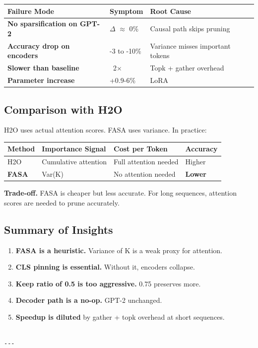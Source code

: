\begin{table}[H]
\centering
\small
\begin{tabular}{lll}
\toprule
\textbf{Failure Mode} & \textbf{Symptom} & \textbf{Root Cause} \\
\midrule
\textbf{No sparsification on GPT-2} & $\Delta$ $\approx$ 0\% & Causal path skips pruning \\
\textbf{Accuracy drop on encoders} & -3 to -10\% & Variance misses important tokens \\
\textbf{Slower than baseline} & ~2$\times$ & Topk + gather overhead \\
\textbf{Parameter increase} & +0.9-6\% & LoRA \\
\bottomrule
\end{tabular}
\end{table}

\subsection{Comparison with H2O}

H2O uses actual attention scores. FASA uses variance. In practice:

\begin{table}[H]
\centering
\small
\begin{tabular}{llll}
\toprule
\textbf{Method} & \textbf{Importance Signal} & \textbf{Cost per Token} & \textbf{Accuracy} \\
\midrule
H2O & Cumulative attention & Full attention needed & Higher \\
\textbf{FASA} & Var(K) & No attention needed & \textbf{Lower} \\
\bottomrule
\end{tabular}
\end{table}

\textbf{Trade-off.} FASA is cheaper but less accurate. For long sequences, 
attention scores are needed to prune accurately.

\subsection{Summary of Insights}

\begin{enumerate}
\item \textbf{FASA is a heuristic.} Variance of K is a weak proxy for attention.
\item \textbf{CLS pinning is essential.} Without it, encoders collapse.
\item \textbf{Keep ratio of 0.5 is too aggressive.} 0.75 preserves more.
\item \textbf{Decoder path is a no-op.} GPT-2 unchanged.
\item \textbf{Speedup is diluted} by gather + topk overhead at short sequences.
\end{enumerate}
\begin{lstlisting}

---
\end{lstlisting}